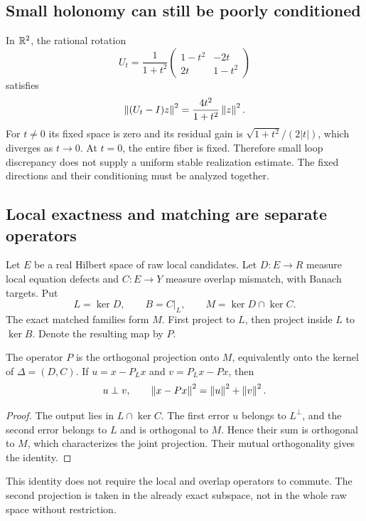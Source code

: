 \subsection{Small holonomy can still be poorly conditioned}
In \(\mathbb R^2\), the rational rotation
\[
 U_t=\frac1{1+t^2}
 \begin{pmatrix}1-t^2&-2t\\2t&1-t^2\end{pmatrix}
\]
satisfies
\[
 \left\lVert(U_t-I)z\right\rVert^2=\frac{4t^2}{1+t^2}\left\lVert z\right\rVert^2.
\]
For \(t\ne0\) its fixed space is zero and its residual gain is \(\sqrt{1+t^2}/(2|t|)\), which diverges as \(t\to0\). At \(t=0\), the entire fiber is fixed. Therefore small loop discrepancy does not supply a uniform stable realization estimate. The fixed directions and their conditioning must be analyzed together.

\label{sec:quantitative}
\subsection{Local exactness and matching are separate operators}
Let \(E\) be a real Hilbert space of raw local candidates. Let \(D:E\to R\) measure local equation defects and \(C:E\to Y\) measure overlap mismatch, with Banach targets. Put
\[
 L=\ker D,\qquad B=C|_L,
 \qquad M=\ker D\cap\ker C.
\]
The exact matched families form \(M\). First project to \(L\), then project inside \(L\) to \(\ker B\). Denote the resulting map by \(P\).

\begin{theorem}\label{KS46}
The operator \(P\) is the orthogonal projection onto \(M\), equivalently onto the kernel of \(\Delta=(D,C)\). If \(u=x-P_Lx\) and \(v=P_Lx-Px\), then
\[
 u\perp v,\qquad\left\lVert x-Px\right\rVert^2=\left\lVert u\right\rVert^2+\left\lVert v\right\rVert^2.
\]
\end{theorem}
\begin{proof}
The output lies in \(L\cap\ker C\). The first error \(u\) belongs to \(L^\perp\), and the second error belongs to \(L\) and is orthogonal to \(M\). Hence their sum is orthogonal to \(M\), which characterizes the joint projection. Their mutual orthogonality gives the identity.
\end{proof}
This identity does not require the local and overlap operators to commute. The second projection is taken in the already exact subspace, not in the whole raw space without restriction.

